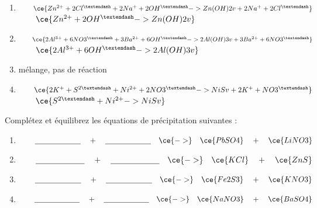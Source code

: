 \documentclass[
  11pt,
  french,
  a4paper,
  openany]{book}
\begin{document}
\begin{Answer}

\begin{enumerate}
\def\labelenumi{\arabic{enumi}.}
\item
  \(\qquad \ce{Zn^{2+} + 2Cl^{–} + 2Na^{+} + 2OH^{–} -> Zn(OH)2 v + 2Na^{+} + 2Cl^{–}}\)\\
  \(\qquad \ce{Zn^{2+} + 2OH^{–} -> Zn(OH)2 v}\)
\item
  \(\qquad \ce{ 2Al^{3+} + 6NO3^{–} + 3Ba^{2+} + 6OH^{–} -> 2Al(OH)3 v + 3Ba^{2+} + 6NO3^{–}}\)\\
  \(\qquad \ce{ 2Al^{3+} + 6OH^{–} -> 2Al(OH)3 v}\)
\item
  mélange, pas de réaction
\item
  \(\qquad \ce{2K^{+} + S^{2–} + Ni^{2+} + 2NO3^{–} -> NiS v + 2K^{+} + NO3^{–}}\)\\
  \(\qquad \ce{S^{2–} + Ni^{2+} -> NiS v}\)
\end{enumerate}


\end{Answer}

\begin{Exercise}

Complétez et équilibrez les équations de précipitation suivantes :

\begin{enumerate}
\def\labelenumi{\arabic{enumi}.}
\item
  \(\qquad \underline{\hspace{6em}} \quad + \quad \underline{\hspace{6em}} \quad \ce{->} \quad \ce{PbSO4} \quad + \quad \ce{LiNO3}\)
\item
  \(\qquad \underline{\hspace{6em}} \quad + \quad \underline{\hspace{6em}} \quad \ce{->} \quad \ce{KCl} \quad + \quad \ce{ZnS}\)
\item
  \(\qquad \underline{\hspace{6em}} \quad + \quad \underline{\hspace{6em}} \quad \ce{->} \quad \ce{Fe2S3} \quad + \quad \ce{KNO3}\)
\item
  \(\qquad \underline{\hspace{6em}} \quad + \quad \underline{\hspace{6em}} \quad \ce{->} \quad \ce{NaNO3} \quad + \quad \ce{BaSO4}\)
\end{enumerate}


\end{Exercise}
\end{document}
